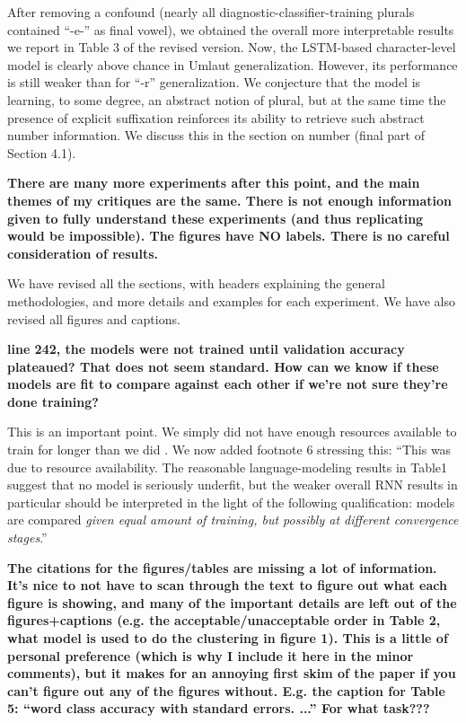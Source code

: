 \documentclass{article}
\begin{document}
{After removing a confound (nearly all diagnostic-classifier-training plurals contained ``-e-'' as final vowel), we obtained the overall more interpretable results we report in Table 3 of the revised version. Now, the LSTM-based character-level model is clearly above chance in Umlaut generalization. However, its performance is still weaker than for ``-r'' generalization. We conjecture that the model is learning, to some degree, an abstract notion of plural, but at the same time the presence of explicit suffixation reinforces its ability to retrieve such abstract number information. We discuss this in the section on number (final part of Section 4.1).
\newline

\textbf{There are many more experiments after this point, and the main themes of my critiques are the same.  There is not enough information given to fully understand these experiments (and thus replicating would be impossible). The figures have NO labels.  There is no careful consideration of results.}

We have revised all the sections, with headers explaining the general methodologies, and more details and examples for each experiment. We have also revised all figures and captions.
\newline

\textbf{line 242, the models were not trained until validation accuracy plateaued? That does not seem standard.  How can we know if these models are fit to compare against each other if we're not sure they're done training?}

This is an important point. We simply did not have enough resources available to train for longer than we did . We now added footnote 6 stressing this: ``This was due to resource availability. The reasonable language-modeling results in Table1 suggest that no model is seriously underfit, but the weaker overall RNN results in particular should be interpreted in the light of the following qualification:  models are compared \emph{given equal amount of training, but possibly at different convergence stages}.''
\newline

\textbf{The citations for the figures/tables are missing a lot of information.  It's nice to not have to scan through the text to figure out what each figure is showing, and many of the important details are left out of the figures+captions (e.g. the acceptable/unacceptable order in Table 2, what model is used to do the clustering in figure 1).  This is a little of personal preference (which is why I include it here in the minor comments), but it makes for an annoying first skim of the paper if you can't figure out any of the figures without.  E.g. the caption for Table 5: ``word class accuracy with standard errors. ...''  For what task???}

}
\end{document}
